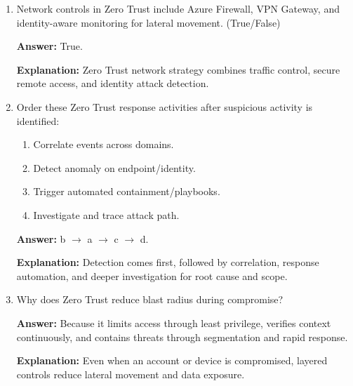 \documentclass[10pt]{article}
\begin{document}
\begin{enumerate}[leftmargin=*]
\textbf{Explanation:} Defender for Cloud assesses posture and recommends remediation, while Azure Policy enforces governance guardrails.

\item Network controls in Zero Trust include Azure Firewall, VPN Gateway, and identity-aware monitoring for lateral movement. (True/False)

\textbf{Answer:} True.

\textbf{Explanation:} Zero Trust network strategy combines traffic control, secure remote access, and identity attack detection.

\item Order these Zero Trust response activities after suspicious activity is identified:
\begin{enumerate}[label=\alph*., leftmargin=1.5em]
\item Correlate events across domains.
\item Detect anomaly on endpoint/identity.
\item Trigger automated containment/playbooks.
\item Investigate and trace attack path.
\end{enumerate}
\textbf{Answer:} b $\rightarrow$ a $\rightarrow$ c $\rightarrow$ d.

\textbf{Explanation:} Detection comes first, followed by correlation, response automation, and deeper investigation for root cause and scope.

\item Why does Zero Trust reduce blast radius during compromise?

\textbf{Answer:} Because it limits access through least privilege, verifies context continuously, and contains threats through segmentation and rapid response.

\textbf{Explanation:} Even when an account or device is compromised, layered controls reduce lateral movement and data exposure.

\end{enumerate}
\end{document}
